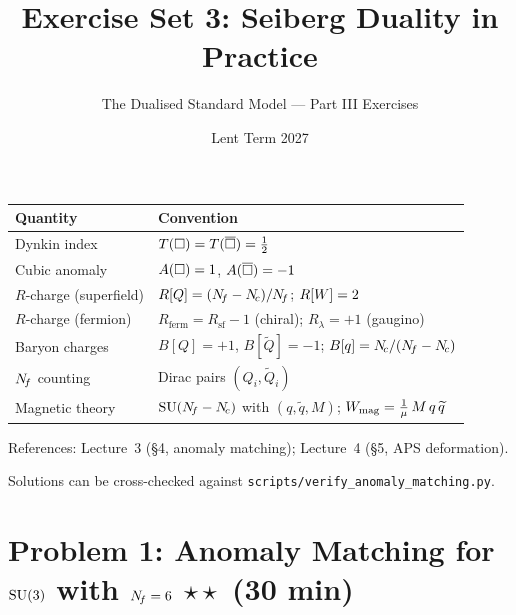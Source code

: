 \documentclass[11pt,a4paper]{article}
\title{\textbf{Exercise Set 3: Seiberg Duality in Practice}}
\author{The Dualised Standard Model --- Part III Exercises}
\date{Lent Term 2027}
\begin{document}
\maketitle

\begin{conventionbox}[title={Conventions for these exercises}]
\renewcommand{\arraystretch}{1.3}
\begin{tabular}{@{}l l@{}}
\toprule
\textbf{Quantity} & \textbf{Convention} \\
\midrule
Dynkin index & $T(\square) = T(\overline{\square}) = \tfrac{1}{2}$ \\
Cubic anomaly & $A(\square) = 1$, \;$A(\overline{\square}) = -1$ \\
$R$-charge (superfield) & $R[Q] = (N_{\!f} - N_{\!c})/N_{\!f}$; \;$R[W] = 2$ \\
$R$-charge (fermion) & $R_{\mathrm{ferm}} = R_{\mathrm{sf}} - 1$ (chiral);
  \;$R_{\lambda} = +1$ (gaugino) \\
Baryon charges & $B[Q] = +1$, \;$B[\widetilde{Q}] = -1$;\quad
  $B[q] = N_{\!c}/(N_{\!f} - N_{\!c})$ \\
$N_{\!f}$ counting & Dirac pairs $(Q_i, \widetilde{Q}_i)$ \\
Magnetic theory & $\mathrm{SU}(N_{\!f} - N_{\!c})$ with $(q, \widetilde{q}, M)$;
  \quad $W_{\mathrm{mag}} = \frac{1}{\mu}\, M\, q\, \widetilde{q}$ \\
\bottomrule
\end{tabular}

\medskip

\noindent References: Lecture~3 (\S4, anomaly matching); Lecture~4 (\S5, APS deformation).

\medskip

\noindent Solutions can be cross-checked against
\texttt{scripts/verify\_anomaly\_matching.py}.
\end{conventionbox}

\bigskip


\section*{Problem 1: Anomaly Matching for $\mathrm{SU}(3)$ with $N_{\!f} = 6$
  \hfill $\star\star$ \normalsize(30 min)}
\label{prob:anomaly-su3-6}
\end{document}
